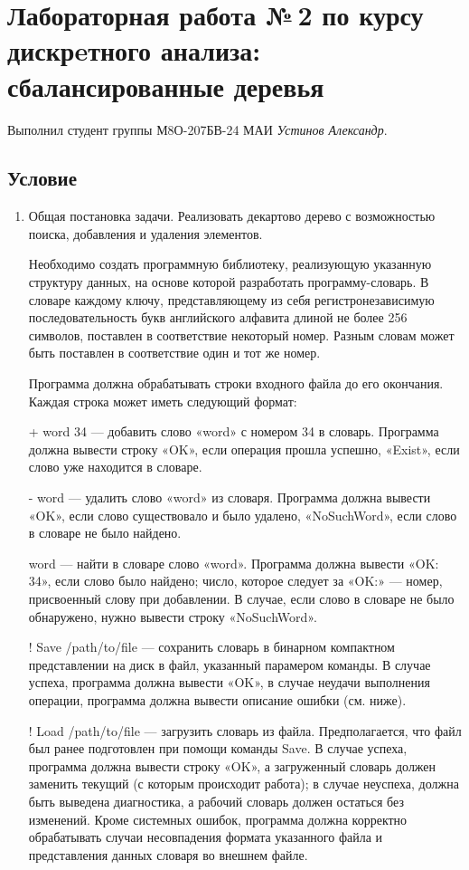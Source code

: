 \documentclass[12pt]{article}
\begin{document}
\section*{Лабораторная работа №\,2 по курсу дискрeтного анализа: сбалансированные деревья}

Выполнил студент группы М8О-207БВ-24 МАИ \textit{Устинов Александр}.

\subsection*{Условие}
 
\begin{enumerate}
\item Общая постановка задачи.
Реализовать декартово дерево с возможностью поиска, добавления и удаления элементов.

Необходимо создать программную библиотеку, реализующую указанную структуру данных, на основе которой разработать программу-словарь. В словаре каждому ключу, представляющему из себя регистронезависимую последовательность букв английского алфавита длиной не более 256 символов, поставлен в соответствие некоторый номер. 
Разным словам может быть поставлен в соответствие один и тот же номер.

Программа должна обрабатывать строки входного файла до его окончания. Каждая строка может иметь следующий формат:

+ word 34 — добавить слово «word» с номером 34 в словарь. Программа должна вывести строку «OK», если операция прошла успешно, «Exist», если слово уже находится в словаре.

- word — удалить слово «word» из словаря. Программа должна вывести «OK», если слово существовало и было удалено, «NoSuchWord», если слово в словаре не было найдено.

word — найти в словаре слово «word». Программа должна вывести «OK: 34», если слово было найдено; число, которое следует за «OK:» — номер, присвоенный слову при добавлении. В случае, если слово в словаре не было обнаружено, нужно вывести строку «NoSuchWord».

! Save /path/to/file — сохранить словарь в бинарном компактном представлении на диск в файл, указанный парамером команды. В случае успеха, программа должна вывести «OK», в случае неудачи выполнения операции, программа должна вывести описание ошибки (см. ниже).

! Load /path/to/file — загрузить словарь из файла. Предполагается, что файл был ранее подготовлен при помощи команды Save. В случае успеха, программа должна вывести строку «OK», а загруженный словарь должен заменить текущий (с которым происходит работа); в случае неуспеха, должна быть выведена диагностика, а рабочий словарь должен остаться без изменений. Кроме системных ошибок, программа должна корректно обрабатывать случаи несовпадения формата указанного файла и представления данных словаря во внешнем файле.


\end{enumerate}
\end{document}

